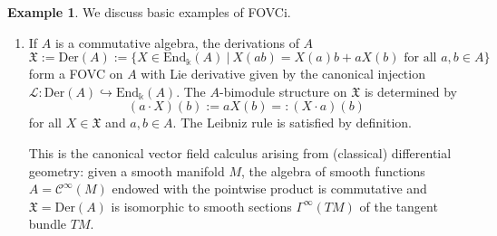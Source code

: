 \documentclass{article}
\theoremstyle{definition}
\newtheorem{example}[thm]{Example}
\begin{document}
	\begin{example}\label{ex:FOVC}
		We discuss basic examples of FOVCi.
		\begin{enumerate}
			\item[i.)] If $A$ is a %
			{commutative} algebra, the derivations of $A$
			$$
			\mathfrak{X}:=\mathrm{Der}(A):=\{X\in\mathrm{End}_\Bbbk(A)~|~X(ab)=X(a)b+aX(b)\text{ for all }a,b\in A\}
			$$
			form a FOVC on $A$ with Lie derivative given by the canonical injection $\mathscr{L}\colon\mathrm{Der}(A)\hookrightarrow\mathrm{End}_\Bbbk(A)$. The $A$-bimodule structure on $\mathfrak{X}$ is determined by 
			$$
			(a\cdot X)(b):=aX(b)=:(X\cdot a)(b)
			$$
			for all $X\in\mathfrak{X}$ and $a,b\in A$. The Leibniz rule is satisfied by definition.
			
			This is the canonical vector field calculus arising from (classical) differential geometry: given a smooth manifold $M$, the algebra of smooth functions $A=\mathscr{C}^\infty(M)$ endowed with the pointwise product is commutative and $\mathfrak{X}=\mathrm{Der}(A)$ is isomorphic to smooth sections $\Gamma^\infty(TM)$ of the tangent bundle $TM$.
			

\end{enumerate}
\end{example}
\end{document}
